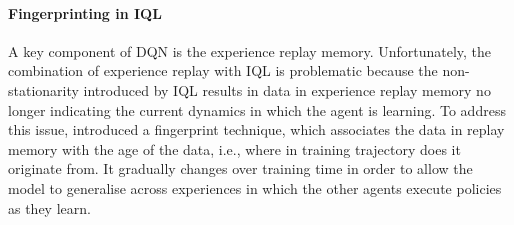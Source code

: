 \documentclass{llncs}
\begin{document}
\paragraph{\textbf{Fingerprinting in IQL}}

A key component of DQN is the experience replay memory.  Unfortunately, the combination of experience replay with IQL is problematic because the non-stationarity introduced by IQL results in data in experience replay memory no longer indicating the current dynamics in which the agent is learning. To address this issue, \cite{Foerster2017} introduced a fingerprint technique, which associates the data in replay memory with the age of the data, i.e., where in training trajectory does it originate from. It gradually changes over training time in order to allow the model to generalise across experiences in which the other agents execute policies as they learn.




\end{document}
